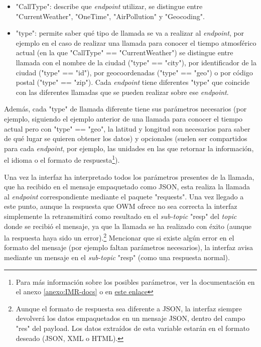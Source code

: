 \documentclass{scrbook}
\begin{document}
\begin{itemize}
    \item "CallType": describe que \textit{endpoint} utilizar, se distingue entre "CurrentWeather", "OneTime", "AirPollution" y "Geocoding".
    \item "type": permite saber qué tipo de llamada se va a realizar al \textit{endpoint}, por ejemplo en el caso de realizar una llamada para conocer el tiempo atmosférico actual (en la que "CallType" == "CurrentWeather") se distingue entre llamada con el nombre de la ciudad ("type" == "city"), por identificador de la ciudad ("type" == "id"), por geocoordenadas  ("type" == "geo") o por código postal  ("type" == "zip"). Cada \textit{endpoint} tiene diferentes "type" que coincide con las diferentes llamadas que se pueden realizar sobre ese \textit{endpoint}.
\end{itemize}

Además, cada "type" de llamada diferente tiene sus parámetros necesarios (por ejemplo, siguiendo el ejemplo anterior de una llamada para conocer el tiempo actual pero con "type" == "geo", la latitud y longitud son necesarios para saber de qué lugar se quieren obtener los datos) y opcionales (suelen ser compartidos para cada \textit{endpoint}, por ejemplo, las unidades en las que retornar la información, el idioma o el formato de respuesta\footnote{Para más información sobre los posibles parámetros, ver la documentación en el anexo \ref{anexo:IMR-docs} o en \href{http://shorturl.at/akyES}{este enlace}}).

Una vez la interfaz ha interpretado todos los parámetros presentes de la llamada, que ha recibido en el mensaje empaquetado como JSON, esta realiza la llamada al \textit{endpoint} correspondiente mediante el paquete "requests". Una vez llegado a este punto, aunque la respuesta que OWM ofrece no sea correcta la interfaz simplemente la retransmitirá como resultado en el \textit{sub-topic} "resp" del \textit{topic} donde se recibió el mensaje, ya que la llamada se ha realizado con éxito (aunque la respuesta haya sido un error).\footnote{Aunque el formato de respuesta sea diferente a JSON, la interfaz siempre devolverá los datos empaquetados en un mensaje JSON, dentro del campo "res" del payload. Los datos extraídos de esta variable estarán en el formato deseado (JSON, XML o HTML).} Mencionar que si existe algún error en el formato del mensaje (por ejemplo faltan parámetros necesarios), la interfaz avisa mediante un mensaje en el \textit{sub-topic} "resp" (como una respuesta normal).
\end{document}
